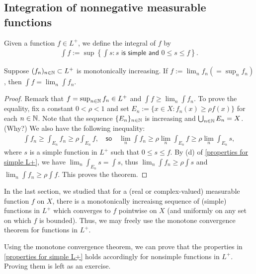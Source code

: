 \subsection{Integration of nonnegative measurable functions}

Given a function $f\in L^+$, we define the integral of $f$ by
\begin{align*}
    \int f:=\sup\left\{
        \int s: \textsf{$s$ is simple and $0\leq s\leq f$}
    \right\}.
\end{align*}

\begin{thm}
    Suppose $(f_n)_{n\in{\mathbb{N}}}\subset L^+$ is monotonically increasing.
    If $f:=\lim_n f_n(=\sup_n f_n)$, then $\int f=\lim_n\int f_n$.
\end{thm}
\begin{proof}
    Remark that $f=\sup_{n\in{\mathbb{N}}} f_n\in L^+$ and $\int f\geq\lim_n\int f_n$.
    To prove the equality, fix a constant $0<\rho<1$ and set $E_n:=\{x\in X: f_n(x)\geq\rho f(x)\}$ for each $n\in{\mathbb{N}}$.
    Note that the sequence $\{E_n\}_{n\in{\mathbb{N}}}$ is increasing and $\bigcup_{n\in{\mathbb{N}}} E_n=X$. \color{brown}(Why?) \color{black}
    We also have the following inequality:
    \begin{align*}
        \int f_n\geq\int_{E_n}f_n\geq\rho\int_{E_n}f,
        \quad\textsf{so}\quad
        \lim_n\int f_n\geq\rho\lim_n\int_{E_n}f\geq\rho\lim_n\int_{E_n}s,
    \end{align*}
    where $s$ is a simple function in $L^+$ such that $0\leq s\leq f$.
    By (d) of \cref{properties for simple L+}, we have $\lim_n\int_{E_n}s=\int s$, thus $\lim_n\int f_n\geq\rho\int s$ and $\lim_n\int f_n\geq\rho\int f$.
    This proves the theorem.
\end{proof}
\begin{rmk}
    In the last section, we studied that for a (real or complex-valued) measurable function $f$ on $X$, there is a monotonically increaisng sequence of (simple) functions in $L^+$ which converges to $f$ pointwise on $X$ (and uniformly on any set on which $f$ is bounded).
    Thus, we may freely use the monotone convergence theorem for functions in $L^+$.
\end{rmk}

Using the monotone convergence theorem, we can prove that the properties in \cref{properties for simple L+} holds accordingly for nonsimple functions in $L^+$.
Proving them is left as an exercise.

